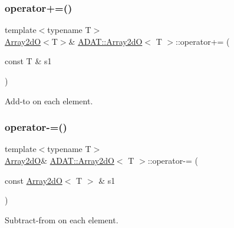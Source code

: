 \subsubsection{\texorpdfstring{operator+=()}{operator+=()}\hspace{0.1cm}{\footnotesize\ttfamily [4/4]}}
{\footnotesize\ttfamily template$<$typename T$>$ \\
\mbox{\hyperlink{classADAT_1_1Array2dO}{Array2dO}}$<$T$>$\& \mbox{\hyperlink{classADAT_1_1Array2dO}{A\+D\+A\+T\+::\+Array2dO}}$<$ T $>$\+::operator+= (\begin{DoxyParamCaption}\item[{const T \&}]{s1 }\end{DoxyParamCaption})\hspace{0.3cm}{\ttfamily [inline]}}



Add-\/to on each element. 

\mbox{\label{classADAT_1_1Array2dO_a16fa54fe6c722762ce47b1d9f56b195a}} 
\subsubsection{\texorpdfstring{operator-\/=()}{operator-=()}\hspace{0.1cm}{\footnotesize\ttfamily [1/4]}}
{\footnotesize\ttfamily template$<$typename T$>$ \\
\mbox{\hyperlink{classADAT_1_1Array2dO}{Array2dO}}\& \mbox{\hyperlink{classADAT_1_1Array2dO}{A\+D\+A\+T\+::\+Array2dO}}$<$ T $>$\+::operator-\/= (\begin{DoxyParamCaption}\item[{const \mbox{\hyperlink{classADAT_1_1Array2dO}{Array2dO}}$<$ T $>$ \&}]{s1 }\end{DoxyParamCaption})\hspace{0.3cm}{\ttfamily [inline]}}



Subtract-\/from on each element. 

\mbox{\label{classADAT_1_1Array2dO_a16fa54fe6c722762ce47b1d9f56b195a}} 
